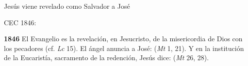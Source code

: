 Jesús viene revelado como Salvador a José

CEC 1846:

\textbf{1846} El Evangelio es la revelación, en Jesucristo, de la misericordia de Dios con los pecadores (cf. \emph{Lc} 15). El ángel anuncia a José:  (\emph{Mt} 1, 21). Y en la institución de la Eucaristía, sacramento de la redención, Jesús dice:  (\emph{Mt} 26, 28).
